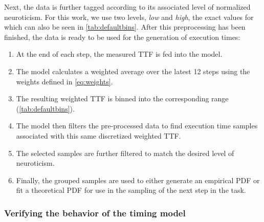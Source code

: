 Next, the data is further tagged according to its associated level of normalized neuroticism.
For this work, we use two levels, \emph{low} and \emph{high}, the exact values for which can also be seen in \cref{tab:defaultbins}.
After this preprocessing has been finished, the data is ready to be used for the generation of execution times:

\begin{enumerate}
    \item At the end of each step, the measured \gls{TTF} is fed into the model.
    \item The model calculates a weighted average over the latest \num{12} steps using the weights defined in \cref{eq:weights}.
    \item The resulting weighted \gls{TTF} is binned into the corresponding range (\cref{tab:defaultbins}).
    \item The model then filters the pre-processed data to find execution time samples associated with this same discretized weighted \gls{TTF}.
    \item The selected samples are further filtered to match the desired level of neuroticism.
    \item Finally, the grouped samples are used to either generate an empirical \gls{PDF} or fit a theoretical \gls{PDF} for use in the sampling of the next step in the task.
\end{enumerate}



\subsubsection{Verifying the behavior of the timing model}\label{ssec:model:verification}

